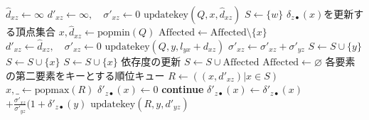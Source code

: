 \begin{algorithm}[tbp]
\begin{multicols}{2}
\begin{algorithmic}[1]
      \Else
      \State $\hat{d}_{xz}\gets\infty$
      \EndIf
      \State $d'_{xz}\gets\infty,\quad\sigma'_{xz}\gets 0$
      \Else
      \State $\mathrm{updatekey}(Q, x, \hat{d}_{xz})$
      \EndIf
      \EndFor
      \State
      \State $S\gets\{w\}$ \Comment $\delta_{z\bullet}(x)$を更新する頂点集合
      \State $x,\hat{d}_{xz}\gets\mathrm{popmin}(Q)$
      \State $\mathrm{Affected}\gets\mathrm{Affected}\setminus\{x\}$
      \State $d'_{xz}\gets\hat{d}_{xz},\quad\sigma'_{xz}\gets 0$
      \State $\mathrm{updatekey}(Q,y,l_{yx}+d_{xz})$
      \EndIf
      \State $\sigma'_{xz}\gets\sigma'_{xz}+\sigma'_{yz}$
      \EndIf
      \State $S\gets S\cup\{y\}$
      \EndIf
      \State $S\gets S\cup\{x\}$
      \EndIf
      \EndFor
      \State $S\gets S\cup\{x\}$
      \EndIf
      \EndWhile
      \State
      \State \LeftComment 依存度の更新
      \State $S\gets S\cup\mathrm{Affected}$
      \State $\mathrm{Affected}\gets\varnothing$
      \State \LeftComment 各要素の第二要素をキーとする順位キュー
      \State $R\gets((x,d'_{xz})\vert x\in S)$
      \State $x,\_\gets\mathrm{popmax}(R)$
      \State $\delta'_{z\bullet}(x)\gets 0$
      \State \textbf{continue}
      \EndIf
      \State $\delta'_{z\bullet}(x)\gets\delta'_{z\bullet}(x)$
      $+\frac{\sigma'_{xz}}{\sigma'_{yz}}(1+\delta'_{z\bullet}(y)$
      \State $\mathrm{updatekey}(R, y, d'_{yz})$
      \EndIf
      \EndFor
      \EndWhile
      \EndProcedure
    \end{algorithmic}
  \end{multicols}
\end{algorithm}
